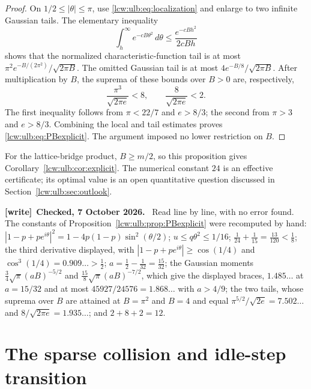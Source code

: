 \documentclass[11pt,letterpaper]{article}
\theoremstyle{remark}\newtheorem{remark}[theorem]{Remark}
\newenvironment{writenote}[1][]{\par\smallskip\begingroup\small
 \noindent\textbf{[write]}\if\relax\detokenize{#1}\relax\else~\textbf{#1.}\fi\ }%
 {\par\endgroup\smallskip}
\begin{document}
\begin{proof}
On $1/2\le|\theta|\le\pi$, use \eqref{lcw:ulb:eq:localization}
and enlarge to two infinite Gaussian tails. The elementary inequality
\[
 \int_h^\infty e^{-cB\theta^2}\,d\theta
       \le\frac{e^{-cBh^2}}{2cBh}
\]
shows that the normalized characteristic-function tail is at most
$\pi^2e^{-B/(2\pi^2)}/\sqrt{2\pi B}$. The omitted Gaussian
tail is at most $4e^{-B/8}/\sqrt{2\pi B}$.
After multiplication by $B$, the suprema of these bounds over $B>0$
are, respectively,
\[
 \frac{\pi^3}{\sqrt{2\pi e}}<8,
 \qquad \frac8{\sqrt{2\pi e}}<2.
\]
The first inequality follows from $\pi<22/7$ and $e>8/3$;
the second from $\pi>3$ and $e>8/3$. Combining the local and tail
estimates proves \eqref{lcw:ulb:eq:PBexplicit}. The argument imposed
no lower restriction on $B$.
\end{proof}

For the lattice-bridge product, $B\ge m/2$, so this proposition gives
Corollary~\ref{lcw:ulb:cor:explicit}. The numerical constant $24$ is an
effective certificate; its optimal value is an open quantitative
question discussed in Section~\ref{lcw:ulb:sec:outlook}.

\begin{writenote}[Checked, 7 October 2026]
Read line by line, with no error found. The constants of
Proposition~\ref{lcw:ulb:prop:PBexplicit} were recomputed by hand:
$|1-p+pe^{i\theta}|^2=1-4p(1-p)\sin^2(\theta/2)$; $u\le q\theta^2\le1/16$;
$\frac1{24}+\frac1{15}=\frac{13}{120}<\frac18$; the third derivative
displayed, with $|1-p+pe^{i\theta}|\ge\cos(1/4)$ and
$\cos^3(1/4)=0.909\ldots>\frac12$; $a=\frac12-\frac1{32}=\frac{15}{32}$; the
Gaussian moments $\frac34\sqrt\pi(aB)^{-5/2}$ and $\frac{15}8\sqrt\pi(aB)^{-7/2}$,
which give the displayed braces, $1.485\ldots$ at $a=15/32$ and at most
$45927/24576=1.868\ldots$ with $a>4/9$; the two tails, whose suprema over
$B$ are attained at $B=\pi^2$ and $B=4$ and equal $\pi^{5/2}/\sqrt{2e}=7.502\ldots$
and $8/\sqrt{2\pi e}=1.935\ldots$; and $2+8+2=12$.
\end{writenote}


\section{The sparse collision and idle-step transition}\label{lcw:ulb:sp:sec:sparse}%
\end{document}
